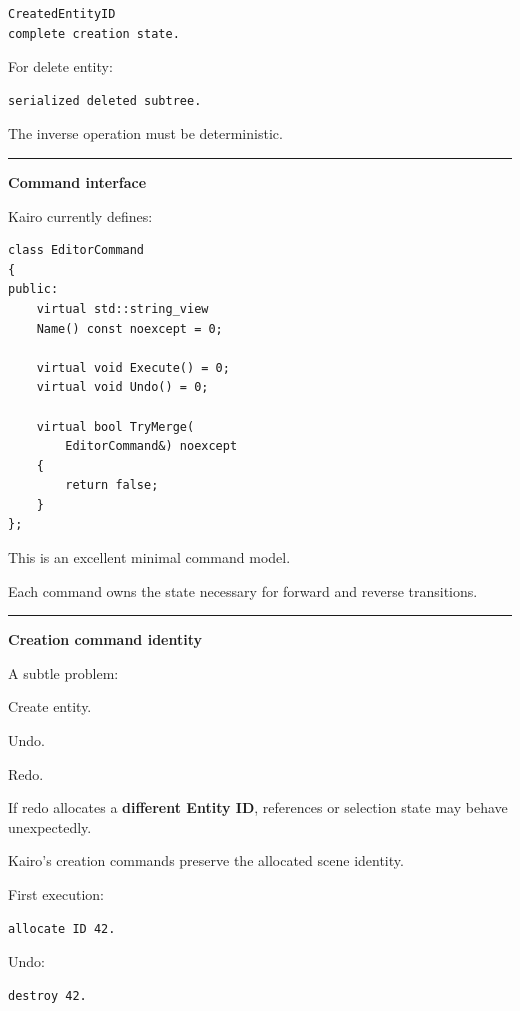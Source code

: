 \begin{verbatim}
CreatedEntityID
complete creation state.
\end{verbatim}

For delete entity:

\begin{verbatim}
serialized deleted subtree.
\end{verbatim}

The inverse operation must be deterministic.

\begin{center}\rule{0.5\linewidth}{0.5pt}\end{center}

\textbf{Command interface}

Kairo currently defines:

\begin{verbatim}
class EditorCommand
{
public:
    virtual std::string_view
    Name() const noexcept = 0;

    virtual void Execute() = 0;
    virtual void Undo() = 0;

    virtual bool TryMerge(
        EditorCommand&) noexcept
    {
        return false;
    }
};
\end{verbatim}

This is an excellent minimal command model.

Each command owns the state necessary for forward and reverse transitions.

\begin{center}\rule{0.5\linewidth}{0.5pt}\end{center}

\textbf{Creation command identity}

A subtle problem:

Create entity.

Undo.

Redo.

If redo allocates a \textbf{different Entity ID}, references or selection state may behave unexpectedly.

Kairo's creation commands preserve the allocated scene identity.

First execution:

\begin{verbatim}
allocate ID 42.
\end{verbatim}

Undo:

\begin{verbatim}
destroy 42.
\end{verbatim}

